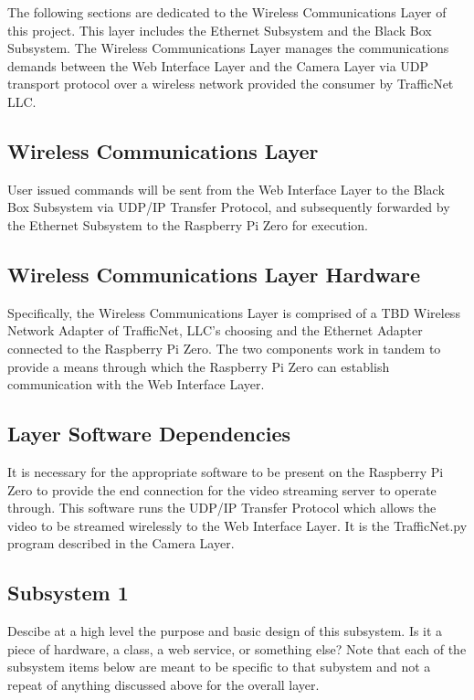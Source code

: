 The following sections are dedicated to the Wireless Communications Layer of this project. This layer includes the Ethernet Subsystem and the Black Box Subsystem. The Wireless Communications Layer manages the communications demands between the Web Interface Layer and the Camera Layer via UDP transport protocol over a wireless network provided the consumer by TrafficNet LLC.

\subsection{Wireless Communications Layer}
User issued commands will be sent from the Web Interface Layer to the Black Box Subsystem via UDP/IP Transfer Protocol, and subsequently forwarded by the Ethernet Subsystem to the Raspberry Pi Zero for execution.   

\subsection{Wireless Communications Layer Hardware}
Specifically, the Wireless Communications Layer is comprised of a TBD Wireless Network Adapter of TrafficNet, LLC's choosing and the Ethernet Adapter connected to the Raspberry Pi Zero. The two components work in tandem to provide a means through which the Raspberry Pi Zero can establish communication with the Web Interface Layer.

\subsection{Layer Software Dependencies}
It is necessary for the appropriate software to be present on the Raspberry Pi Zero to provide the end connection for the video streaming server to operate through. This software runs the UDP/IP Transfer Protocol which allows the video to be streamed wirelessly to the Web Interface Layer. It is the TrafficNet.py program described in the Camera Layer.

\subsection{Subsystem 1}
Descibe at a high level the purpose and basic design of this subsystem. Is it a piece of hardware, a class, a web service, or something else? Note that each of the subsystem items below are meant to be specific to that subystem and not a repeat of anything discussed above for the overall layer.

